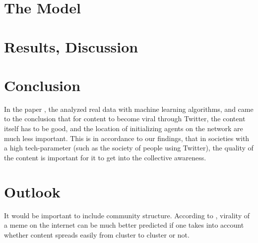 \documentclass [12pt,a4paper,twoside]{article}
\begin{document}
\section{The Model}


\section{Results, Discussion}

\section{Conclusion}
In the paper \cite{Similar-results}, the analyzed real data with machine learning algorithms, and came to the conclusion that for content to become viral through Twitter, the content itself has to be good, and the location of initializing agents on the network are much less important. This is in accordance to our findings, that in societies with a high tech-parameter (such as the society of people using Twitter), the quality of the content is important for it to get into the collective awareness.

\section{Outlook}
It would be important to include community structure. According to \cite{Virality-community-important}, virality of a meme on the internet can be much better predicted if one takes into account whether content spreads easily from cluster to cluster or not.

\small \setlength{\bibsep}{1pt}

%

\end{document}
